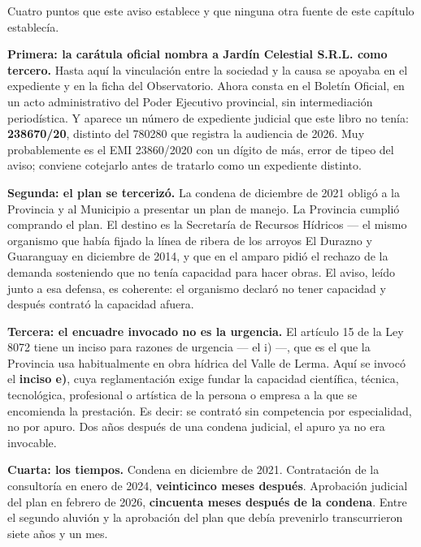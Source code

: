 \begin{cautela}
Cuatro puntos que este aviso establece y que ninguna otra fuente de este capítulo establecía.

\textbf{Primera: la carátula oficial nombra a Jardín Celestial S.R.L. como tercero.} Hasta aquí la vinculación entre la sociedad y la causa se apoyaba en el expediente y en la ficha del Observatorio. Ahora consta en el Boletín Oficial, en un acto administrativo del Poder Ejecutivo provincial, sin intermediación periodística. Y aparece un número de expediente judicial que este libro no tenía: \textbf{238670/20}, distinto del 780280 que registra la audiencia de 2026. Muy probablemente es el EMI 23860/2020 con un dígito de más, error de tipeo del aviso; conviene cotejarlo antes de tratarlo como un expediente distinto.

\textbf{Segunda: el plan se tercerizó.} La condena de diciembre de 2021 obligó a la Provincia y al Municipio a presentar un plan de manejo. La Provincia cumplió comprando el plan. El destino es la Secretaría de Recursos Hídricos --- el mismo organismo que había fijado la línea de ribera de los arroyos El Durazno y Guaranguay en diciembre de 2014, y que en el amparo pidió el rechazo de la demanda sosteniendo que no tenía capacidad para hacer obras. El aviso, leído junto a esa defensa, es coherente: el organismo declaró no tener capacidad y después contrató la capacidad afuera.

\textbf{Tercera: el encuadre invocado no es la urgencia.} El artículo 15 de la Ley 8072 tiene un inciso para razones de urgencia --- el i) ---, que es el que la Provincia usa habitualmente en obra hídrica del Valle de Lerma. Aquí se invocó el \textbf{inciso e)}, cuya reglamentación exige fundar la capacidad científica, técnica, tecnológica, profesional o artística de la persona o empresa a la que se encomienda la prestación. Es decir: se contrató sin competencia por especialidad, no por apuro. Dos años después de una condena judicial, el apuro ya no era invocable.

\textbf{Cuarta: los tiempos.} Condena en diciembre de 2021. Contratación de la consultoría en enero de 2024, \textbf{veinticinco meses después}. Aprobación judicial del plan en febrero de 2026, \textbf{cincuenta meses después de la condena}. Entre el segundo aluvión y la aprobación del plan que debía prevenirlo transcurrieron siete años y un mes.
\end{cautela}

